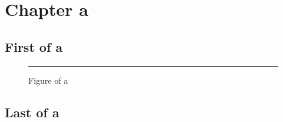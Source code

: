 \chapter{Chapter a}
\section{First of a}
\lipsum[1-3]
\begin{figure}[h]\centering\rule{2cm}{1cm}\caption{Figure of a}\end{figure}
\section{Last of a}\label{last-a}
\lipsum[4-6]
